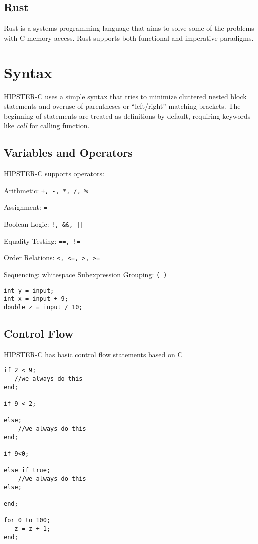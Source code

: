 \documentclass{article}
\begin{document}
\subsection{Rust}
Rust is a systems programming language that aims to solve some of the problems with C memory access. Rust supports both functional and imperative paradigms.




\section{Syntax}
HIPSTER-C uses a simple syntax that tries to minimize cluttered nested block statements and overuse of parentheses or ``left/right'' matching brackets. The beginning of statements are treated as definitions by default, requiring keywords like \textit{call} for calling function.  


\subsection{Variables and Operators}
HIPSTER-C supports operators:\par
Arithmetic: \texttt{+, -, *, /, \%}\par 
Assignment: \texttt{=}\par
Boolean Logic: \texttt{!, \&\&, ||}\par
Equality Testing: \texttt{==, !=}\par
Order Relations: \texttt{<, <=, >, >=}\par
Sequencing: whitespace
Subexpression Grouping: \texttt{( )}\par 



\begin{verbatim}
int y = input;
int x = input + 9;
double z = input / 10;

\end{verbatim}


\subsection{Control Flow}
HIPSTER-C has basic control flow statements based on C

\begin{verbatim}
if 2 < 9;
   //we always do this
end; 

if 9 < 2;

else;
    //we always do this
end;

if 9<0;

else if true;
    //we always do this
else;

end; 

for 0 to 100;
   z = z + 1;
end;

\end{verbatim}
\end{document}
